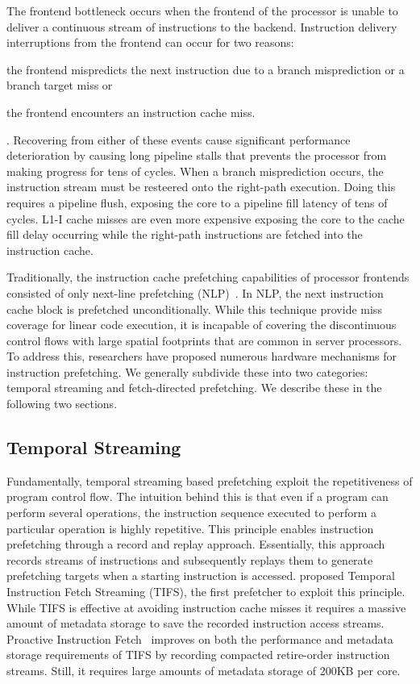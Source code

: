 \documentclass[../main.tex]{subfiles}
\begin{document}
\begin{refsection}
The frontend bottleneck occurs when the frontend of the processor is
unable to deliver a continuous stream of instructions to the backend.
Instruction delivery interruptions from the frontend can occur for two
reasons: \begin{inparaenum}[1)] \item the frontend mispredicts the
  next instruction due to a branch misprediction or a branch target
  miss or \item the frontend encounters an instruction cache
  miss.\end{inparaenum}. Recovering from either of these events cause
significant performance deterioration by causing long pipeline stalls
that prevents the processor from making progress for tens of
cycles. When a branch misprediction occurs, the instruction stream
must be resteered onto the right-path execution. Doing this requires a
pipeline flush, exposing the core to a pipeline fill latency of tens
of cycles. L1-I cache misses are even more expensive exposing the core
to the cache fill delay occurring while the right-path instructions are
fetched into the instruction cache.

Traditionally, the instruction cache prefetching capabilities of
processor frontends consisted of only next-line prefetching
(NLP)~\cite{nextline_pref}. In NLP, the next instruction cache block
is prefetched unconditionally. While this technique provide miss
coverage for linear code execution, it is incapable of covering the
discontinuous control flows with large spatial footprints that are
common in server processors. To address this, researchers have
proposed numerous hardware mechanisms for instruction prefetching. We
generally subdivide these into two categories: temporal streaming and
fetch-directed prefetching. We describe these in the following two
sections.

\subsection{Temporal Streaming} Fundamentally, temporal streaming
based prefetching exploit the repetitiveness of program control
flow. The intuition behind this is that even if a program can perform
several operations, the instruction sequence executed to perform a
particular operation is highly repetitive. This principle enables
instruction prefetching through a record and replay
approach. Essentially, this approach records streams of instructions
and subsequently replays them to generate prefetching targets when a
starting instruction is accessed. \textcite{ferdman08_tempor} proposed
Temporal Instruction Fetch Streaming (TIFS), the first prefetcher to
exploit this principle. While TIFS is effective at avoiding
instruction cache misses it requires a massive amount of metadata
storage to save the recorded instruction access streams.  Proactive
Instruction Fetch~\cite{ferdman11_proac_instr_fetch} improves on both
the performance and metadata storage requirements of TIFS by recording
compacted retire-order instruction streams. Still, it requires large
amounts of metadata storage of 200KB per core.  


\end{refsection}
\end{document}
